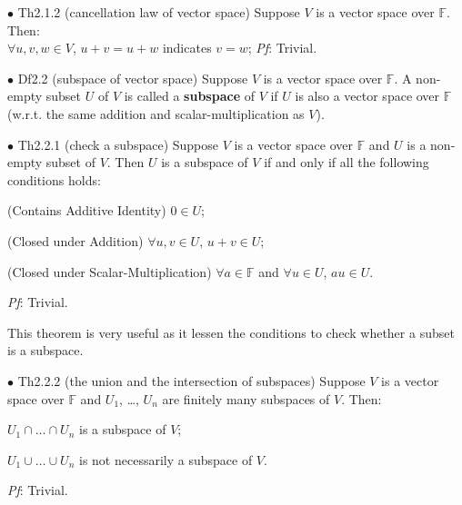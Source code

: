 \documentclass{article}
\begin{document}
\begin{Th}{$\bullet$ Th2.1.2 (cancellation law of vector space)}
    Suppose $V$ is a vector space over $\mathbb{F}$. Then: \\
    $\forall u,v,w\in V$, $u+v=u+w$ indicates $v=w$;
    \tcblower
    \textit{Pf}: Trivial.
\end{Th}

\begin{Df}{$\bullet$ Df2.2 (subspace of vector space)}
    Suppose $V$ is a vector space over $\mathbb{F}$. A non-empty subset $U$ of $V$ is called a \textbf{subspace} of $V$ if $U$ is also a vector space over $\mathbb{F}$ (w.r.t. the same addition and scalar-multiplication as $V$).
\end{Df}

\begin{Th}{$\bullet$ Th2.2.1 (check a subspace)}
    Suppose $V$ is a vector space over $\mathbb{F}$ and $U$ is a non-empty subset of $V$. Then $U$ is a subspace of $V$ if and only if all the following conditions holds:
    \begin{compactenum}
        \item (Contains Additive Identity) $0\in U$;
        \item (Closed under Addition) $\forall u,v\in U$, $u+v\in U$;
        \item (Closed under Scalar-Multiplication) $\forall a\in\mathbb{F}$ and $\forall u\in U$, $au\in U$.
    \end{compactenum}
    \tcblower
    \textit{Pf}: Trivial.
\end{Th}

\begin{Rmk}{}
    This theorem is very useful as it lessen the conditions to check whether a subset is a subspace.
\end{Rmk}

\begin{Th}{$\bullet$ Th2.2.2 (the union and the intersection of subspaces)}
    Suppose $V$ is a vector space over $\mathbb{F}$ and $U_1$, \dots, $U_n$ are finitely many subspaces of $V$. Then:
    \begin{compactenum}
        \item $U_1\cap \dots \cap U_n$ is a subspace of $V$;
        \item $U_1\cup \dots \cup U_n$ is not necessarily a subspace of $V$.
    \end{compactenum}
    \tcblower
    \textit{Pf}: Trivial.
\end{Th}
\end{document}
